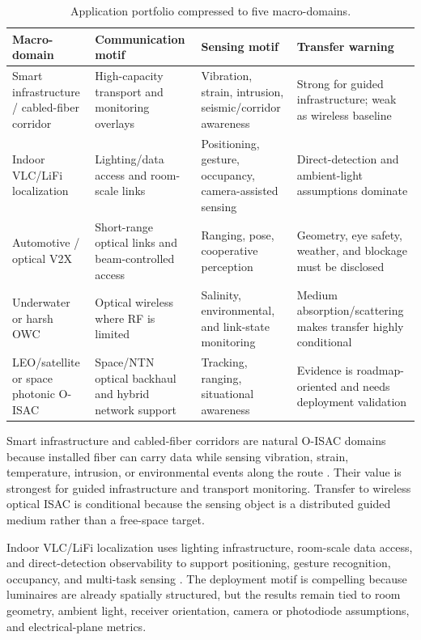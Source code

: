 \documentclass[letterpaper,journal]{IEEEtran}
\begin{document}
\begin{table}[!t]
    \caption{Application portfolio compressed to five macro-domains.}
    \label{tab:section7_portfolio}
    \centering
    \scriptsize
    \setlength{\tabcolsep}{2.8pt}
    \renewcommand{\arraystretch}{1.08}
    \begin{tabularx}{\textwidth}{@{}p{2.35cm}p{2.6cm}p{2.55cm}X@{}}
        \toprule
        Macro-domain & Communication motif & Sensing motif & Transfer warning \\
        \midrule
        Smart infrastructure / cabled-fiber corridor & High-capacity transport and monitoring overlays & Vibration, strain, intrusion, seismic/corridor awareness & Strong for guided infrastructure; weak as wireless baseline \\
        Indoor VLC/LiFi localization & Lighting/data access and room-scale links & Positioning, gesture, occupancy, camera-assisted sensing & Direct-detection and ambient-light assumptions dominate \\
        Automotive / optical V2X & Short-range optical links and beam-controlled access & Ranging, pose, cooperative perception & Geometry, eye safety, weather, and blockage must be disclosed \\
        Underwater or harsh OWC & Optical wireless where RF is limited & Salinity, environmental, and link-state monitoring & Medium absorption/scattering makes transfer highly conditional \\
        LEO/satellite or space photonic O-ISAC & Space/NTN optical backhaul and hybrid network support & Tracking, ranging, situational awareness & Evidence is roadmap-oriented and needs deployment validation \\
        \bottomrule
    \end{tabularx}
\end{table}

Smart infrastructure and cabled-fiber corridors are natural O-ISAC domains because installed fiber can carry data while sensing vibration, strain, temperature, intrusion, or environmental events along the route \cite{O_ISAC_013,O_ISAC_020,O_ISAC_038,O_ISAC_064,O_ISAC_069,O_ISAC_074}. Their value is strongest for guided infrastructure and transport monitoring. Transfer to wireless optical ISAC is conditional because the sensing object is a distributed guided medium rather than a free-space target.

Indoor VLC/LiFi localization uses lighting infrastructure, room-scale data access, and direct-detection observability to support positioning, gesture recognition, occupancy, and multi-task sensing \cite{O_ISAC_009,O_ISAC_011,O_ISAC_022,O_ISAC_030,O_ISAC_039,O_ISAC_050,O_ISAC_054,O_ISAC_060}. The deployment motif is compelling because luminaires are already spatially structured, but the results remain tied to room geometry, ambient light, receiver orientation, camera or photodiode assumptions, and electrical-plane metrics.
\end{document}
